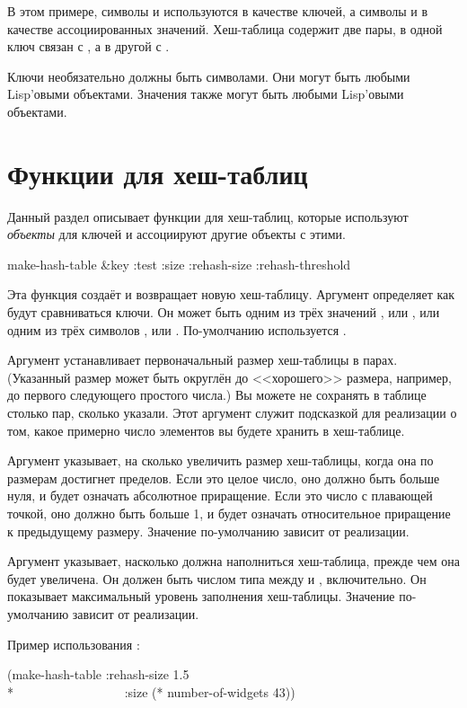 В этом примере, символы  и  используются в качестве ключей, а
символы  и  в качестве ассоциированных значений. Хеш-таблица
содержит две пары, в одной ключ  связан с , а в другой
 с .

Ключи необязательно должны быть символами. Они могут быть любыми Lisp'овыми
объектами. Значения также могут быть любыми Lisp'овыми объектами.

\section{Функции для хеш-таблиц}

Данный раздел описывает функции для хеш-таблиц, которые используют
\emph{объекты} для ключей и ассоциируют другие объекты с этими.

\begin{defun}[Function]
make-hash-table &key :test :size :rehash-size :rehash-threshold

Эта функция создаёт и возвращает новую хеш-таблицу.
Аргумент  определяет как будут сравниваться ключи.
Он может быть одним из трёх значений ,  или ,
или одним из трёх символов ,  или .
По-умолчанию используется .

Аргумент  устанавливает первоначальный размер хеш-таблицы в парах.
(Указанный размер может быть округлён до <<хорошего>> размера, например, до
первого следующего простого числа.)
Вы можете не сохранять в таблице столько пар, сколько указали. Этот аргумент
служит подсказкой для реализации о том, какое примерно число элементов вы будете
хранить в хеш-таблице.

Аргумент  указывает, на сколько увеличить размер хеш-таблицы,
когда она по размерам достигнет пределов.
Если это целое число, оно должно быть больше нуля, и будет означать абсолютное
приращение. Если это число с плавающей точкой, оно должно быть больше 1, и будет
означать относительное приращение к предыдущему размеру.
Значение по-умолчанию зависит от реализации.

\begin{newer}
Аргумент  указывает, насколько должна наполниться
хеш-таблица, прежде чем она будет увеличена. Он должен быть числом типа
 между  и , включительно.
Он показывает максимальный уровень заполнения хеш-таблицы.
Значение по-умолчанию зависит от реализации.
\end{newer}

Пример использования :
\begin{lisp}
(make-hash-table :rehash-size 1.5 \\*
~~~~~~~~~~~~~~~~~:size (* number-of-widgets 43))
\end{lisp}
\end{defun}

